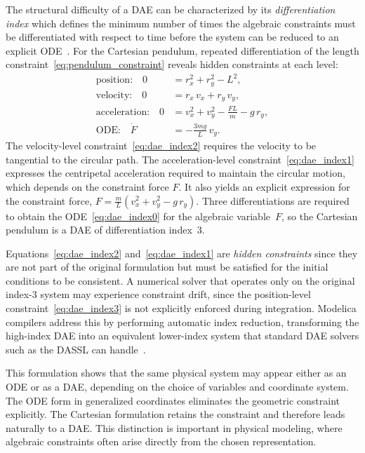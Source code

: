 The structural difficulty of a \ac{DAE} can be characterized by its \emph{differentiation index} which defines the minimum number of times the algebraic constraints must be differentiated with respect to time before the system can be reduced to an explicit \ac{ODE}~\cite{kunkel_differential-algebraic_2024}.
For the Cartesian pendulum, repeated differentiation of the length constraint~\eqref{eq:pendulum_constraint} reveals hidden constraints at each level:
%
\begin{align}
    \text{position:} \quad
        0 &= r_x^2 + r_y^2 - L^2,
        \label{eq:dae_index3} \\
    \text{velocity:} \quad
        0 &= r_x\,v_x + r_y\,v_y,
        \label{eq:dae_index2} \\
    \text{acceleration:} \quad
        0 &= v_x^2 + v_y^2
             - \frac{FL}{m} - g\,r_y,
        \label{eq:dae_index1} \\
    \text{ODE:} \quad
        \dot{F} &= -\frac{3mg}{L}\,v_y.
        \label{eq:dae_index0}
\end{align}
%
The velocity-level constraint~\eqref{eq:dae_index2} requires the velocity to be tangential to the circular path.
The acceleration-level constraint~\eqref{eq:dae_index1} expresses the centripetal acceleration required to maintain the circular motion, which depends on the constraint force $F$.
It also yields an explicit expression for the constraint force, $F = \tfrac{m}{L}(v_x^2 + v_y^2 - g\,r_y)$.
Three differentiations are required to obtain the \ac{ODE}~\eqref{eq:dae_index0} for the algebraic variable~$F$, so the Cartesian pendulum is a \ac{DAE} of differentiation index~3.

Equations~\eqref{eq:dae_index2} and~\eqref{eq:dae_index1} are \emph{hidden constraints} since they are not part of the original formulation but must be satisfied for the initial conditions to be consistent.
A numerical solver that operates only on the original index-3 system may experience constraint drift, since the position-level constraint~\eqref{eq:dae_index3} is not explicitly enforced during integration.
Modelica compilers address this by performing automatic index reduction, transforming the high-index \ac{DAE} into an equivalent lower-index system that standard \ac{DAE} solvers such as the \ac{DASSL} can handle~\cite{Modelica_Fritzson, petzold_description_1982}.

This formulation shows that the same physical system may appear either as an \ac{ODE} or as a \ac{DAE}, depending on the choice of variables and coordinate system.
The \ac{ODE} form in generalized coordinates eliminates the geometric constraint explicitly.
The Cartesian formulation retains the constraint and therefore leads naturally to a \ac{DAE}.
This distinction is important in physical modeling, where algebraic constraints often arise directly from the chosen representation.

